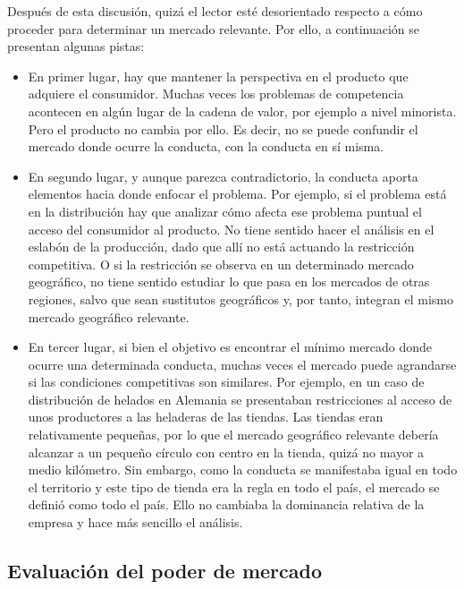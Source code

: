 \documentclass[
  12pt,
  spanish,
]{book}
\begin{document}
Después de esta discusión, quizá el lector esté desorientado respecto a cómo proceder para determinar un mercado relevante. Por ello, a continuación se presentan algunas pistas:

\begin{itemize}
\item
  En primer lugar, hay que mantener la perspectiva en el producto que adquiere el consumidor. Muchas veces los problemas de competencia acontecen en algún lugar de la cadena de valor, por ejemplo a nivel minorista. Pero el producto no cambia por ello. Es decir, no se puede confundir el mercado donde ocurre la conducta, con la conducta en sí misma.
\item
  En segundo lugar, y aunque parezca contradictorio, la conducta aporta elementos hacia donde enfocar el problema. Por ejemplo, si el problema está en la distribución hay que analizar cómo afecta ese problema puntual el acceso del consumidor al producto. No tiene sentido hacer el análisis en el eslabón de la producción, dado que allí no está actuando la restricción competitiva. O si la restricción se observa en un determinado mercado geográfico, no tiene sentido estudiar lo que pasa en los mercados de otras regiones, salvo que sean sustitutos geográficos y, por tanto, integran el mismo mercado geográfico relevante.
\item
  En tercer lugar, si bien el objetivo es encontrar el mínimo mercado donde ocurre una determinada conducta, muchas veces el mercado puede agrandarse si las condiciones competitivas son similares. Por ejemplo, en un caso de distribución de helados en Alemania se presentaban restricciones al acceso de unos productores a las heladeras de las tiendas. Las tiendas eran relativamente pequeñas, por lo que el mercado geográfico relevante debería alcanzar a un pequeño círculo con centro en la tienda, quizá no mayor a medio kilómetro. Sin embargo, como la conducta se manifestaba igual en todo el territorio y este tipo de tienda era la regla en todo el país, el mercado se definió como todo el país. Ello no cambiaba la dominancia relativa de la empresa y hace más sencillo el análisis.
\end{itemize}

\hypertarget{evaluaciuxf3n-del-poder-de-mercado}{%
\subsection{Evaluación del poder de mercado}\label{evaluaciuxf3n-del-poder-de-mercado}}
\end{document}
